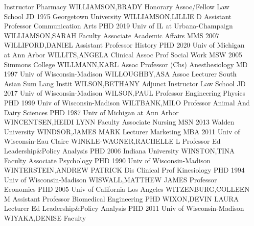 \documentclass[
]{article}
\begin{document}
Instructor \textbar{}  \textbar Pharmacy
\textbar WILLIAMSON,BRADY \textbar Honorary Assoc/Fellow \textbar Law
School \textbar{}  \textbar JD 1975 Georgetown University
\textbar WILLIAMSON,LILLIE D \textbar Assistant Professor
\textbar Communication Arts \textbar{}  \textbar PHD 2019
Univ of IL at Urbana-Champaign \textbar WILLIAMSON,SARAH
\textbar Faculty Associate \textbar Academic Affairs \textbar{}
 \textbar MMS 2007 \textbar WILLIFORD,DANIEL
\textbar Assistant Professor \textbar History \textbar{} 
\textbar PHD 2020 Univ of Michigan at Ann Arbor \textbar WILLITS,ANGELA
\textbar Clinical Assoc Prof \textbar Social Work \textbar{}
 \textbar MSW 2005 Simmons College \textbar WILLMANN,KARL
\textbar Assoc Professor (Chs) \textbar Anesthesiology \textbar{}
 \textbar MD 1997 Univ of Wisconsin-Madison
\textbar WILLOUGHBY,ASA \textbar Assoc Lecturer \textbar South Asian Sum
Lang Instit \textbar{}  \textbar WILSON,BETHANY
\textbar Adjunct Instructor \textbar Law School \textbar JD 2017 Univ of
Wisconsin-Madison \textbar{}  \textbar WILSON,PAUL
\textbar Professor \textbar Engineering Physics \textbar PHD 1999 Univ
of Wisconsin-Madison \textbar{}  \textbar WILTBANK,MILO
\textbar Professor \textbar Animal And Dairy Sciences \textbar PHD 1987
Univ of Michigan at Ann Arbor \textbar{} 
\textbar WINCENTSEN,HEIDI LYNN \textbar Faculty Associate
\textbar Nursing \textbar MSN 2013 Walden University \textbar{}
 \textbar WINDSOR,JAMES MARK \textbar Lecturer
\textbar Marketing \textbar MBA 2011 Univ of Wisconsin-Eau Claire
\textbar{}  \textbar WINKLE-WAGNER,RACHELLE L
\textbar Professor \textbar Ed Leadership\&Policy Analysis \textbar PHD
2006 Indiana University \textbar{}  \textbar WINSTON,TINA
\textbar Faculty Associate \textbar Psychology \textbar PHD 1990 Univ of
Wisconsin-Madison \textbar{}  \textbar WINTERSTEIN,ANDREW
PATRICK \textbar Dis Clinical Prof \textbar Kinesiology \textbar PHD
1994 Univ of Wisconsin-Madison \textbar{} 
\textbar WISWALL,MATTHEW JAMES \textbar Professor \textbar Economics
\textbar PHD 2005 Univ of California Los Angeles \textbar{} 
\textbar WITZENBURG,COLLEEN M \textbar Assistant Professor
\textbar Biomedical Engineering \textbar PHD \textbar{} 
\textbar WIXON,DEVIN LAURA \textbar Lecturer \textbar Ed
Leadership\&Policy Analysis \textbar PHD 2011 Univ of Wisconsin-Madison
\textbar{}  \textbar WIYAKA,DENISE \textbar Faculty
\end{document}
